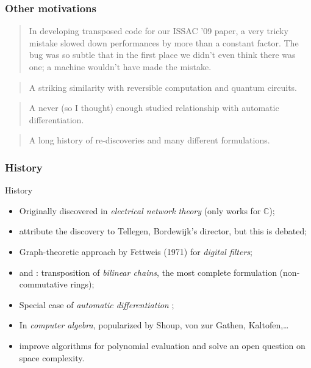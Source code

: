 \documentclass[10pt]{beamer}
\newcommand{\C}{\mathbb{C}}
\begin{document}

\begin{frame}
  \frametitle{Other motivations}

  \begin{quote}
    In developing transposed code for our ISSAC '09 paper, a very
    tricky mistake slowed down performances by more than a constant
    factor. The bug was so subtle that in the first place we didn't
    even think there was one; a machine wouldn't have made the
    mistake.
  \end{quote}
  \hfill

  \begin{quote}
    A striking similarity with reversible computation and quantum
    circuits.
  \end{quote}
  \hfill

  \begin{quote}
    A never (so I thought) enough studied relationship with automatic
    differentiation.
  \end{quote}
  \hfill

  \begin{quote}
    A long history of re-discoveries and many different formulations.
  \end{quote}
\end{frame}


\begin{frame}
  \frametitle{History}

  \begin{block}{History}
    \begin{itemize}
    \item Originally discovered in \emph{electrical network theory}
      \cite{Bor56} (only works for $\C$);
    \item \cite{BCS} attribute the discovery to Tellegen, Bordewijk's
      director, but this is debated;
    \item Graph-theoretic approach by Fettweis (1971) for
      \emph{digital filters};
    \item \cite{Fid73} and \cite{HoMu73}: transposition of
      \emph{bilinear chains}, the most complete formulation
      (non-commutative rings);
    \item Special case of \emph{automatic differentiation}
      \cite{BS83};
    \item In \emph{computer algebra}, popularized by Shoup, von zur
      Gathen, Kaltofen,\dots
    \item \cite{BLS03} improve algorithms for polynomial evaluation
      and solve an open question on space complexity.
    \end{itemize}
  \end{block}
\end{frame}
\end{document}
